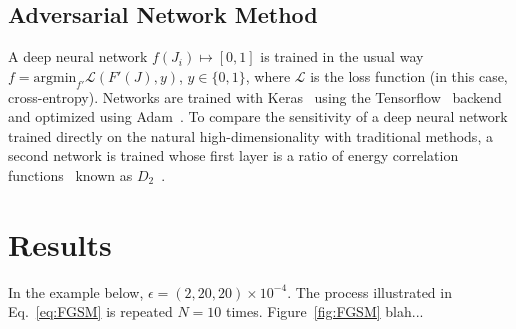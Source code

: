 \documentclass[reprint,nofootinbib,...]{revtex4-1}
\begin{document}
\subsection{Adversarial Network Method}



A deep neural network $f(J_i)\mapsto [0,1]$ is trained in the usual way $f=\text{argmin}_{f'}\mathcal{L}(F'(J),y)$, $y\in\{0,1\}$, where $\mathcal{L}$ is the loss function (in this case, cross-entropy).
Networks are trained with Keras~\cite{keras} using the Tensorflow~\cite{tensorflow} backend and optimized using Adam~\cite{adam}.
To compare the sensitivity of a deep neural network trained directly on the natural high-dimensionality with traditional methods, a second network is trained whose first layer is a ratio of energy correlation functions~\cite{Larkoski:2013eya} known as $D_2$~\cite{Larkoski:2014gra}.


\section{Results}

In the example below, $\epsilon=(2,20,20)\times 10^{-4}$.  The process illustrated in Eq.~\ref{eq:FGSM} is repeated $N=10$ times.  Figure~\ref{fig:FGSM} blah...
\end{document}
